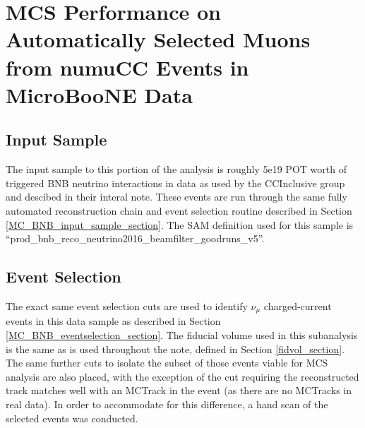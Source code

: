 \section{MCS Performance on Automatically Selected Muons from numuCC Events in MicroBooNE Data}\label{data_performance_section}

\subsection{Input Sample}
The input sample to this portion of the analysis is roughly 5e19 POT worth of triggered BNB neutrino interactions in {\ub} data as used by the CCInclusive group and descibed in their interal note\cite{CCIncInternalNote}. These events are run through the same fully automated reconstruction chain and event selection routine described in Section \ref{MC_BNB_input_sample_section}. The SAM definition used for this sample is ``prod\_bnb\_reco\_neutrino2016\_beamfilter\_goodruns\_v5''.

\subsection{Event Selection}
The exact same event selection cuts are used to identify $\nu_\mu$ charged-current events in this data sample as described in Section \ref{MC_BNB_eventselection_section}. The fiducial volume used in this subanalysis is the same as is used throughout the note, defined in Section \ref{fidvol_section}. The same further cuts to isolate the subset of those events viable for MCS analysis are also placed, with the exception of the cut requiring the reconstructed track matches well with an {\sc MCTrack} in the event (as there are no {\sc MCTracks} in real data). In order to accommodate for this difference, a hand scan of the selected events was conducted.\\

